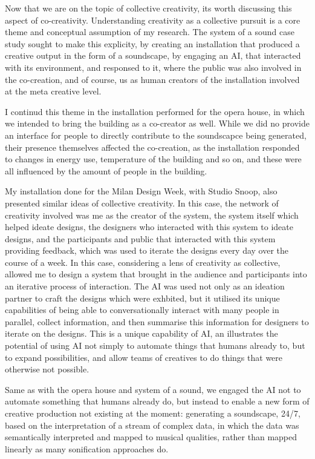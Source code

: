 Now that we are on the topic of collective creativity, its worth discussing this aspect of co-creativity. Understanding creativity as a collective pursuit is a core theme and conceptual assumption of my research. The system of a sound case study sought to make this explicity, by creating an installation that produced a creative output in the form of a soundscape, by engaging an AI, that interacted with its environment, and responsed to it, where the public was also involved in the co-creation, and of course, us as human creators of the installation involved at the meta creative level. 

I continud this theme in the installation performed for the opera house, in which we intended to bring the building as a co-creator as well. While we did no provide an interface for people to directly contribute to the soundscapce being generated, their presence themselves affected the co-creation, as the installation responded to changes in energy use, temperature of the building and so on, and these were all influenced by the amount of people in the building. 

My installation done for the Milan Design Week, with Studio Snoop, also presented similar ideas of collective creativity. In this case, the network of creativity involved was me as the creator of the system, the system itself which helped ideate designs, the designers who interacted with this system to ideate designs, and the participants and public that interacted with this system providing feedback, which was used to iterate the designs every day over the course of a week. In this case, considering a lens of creativity as collective, allowed me to design a system that brought in the audience and participants into an iterative process of interaction. The AI was used not only as an ideation partner to craft the designs which were exhbited, but it utilised its unique capabilities of being able to conversationally interact with many people in parallel, collect information, and then summarise this information for designers to iterate on the designs. This is a unique capability of AI, an illustrates the potential of using AI not simply to automate things that humans already to, but to expand possibilities, and allow teams of creatives to do things that were otherwise not possible. 

Same as with the opera house and system of a sound, we engaged the AI not to automate something that humans already do, but instead to enable a new form of creative production not existing at the moment: generating a soundscape, 24/7, based on the interpretation of a stream of complex data, in which the data was semantically interpreted and mapped to musical qualities, rather than mapped linearly as many sonification approaches do. 

